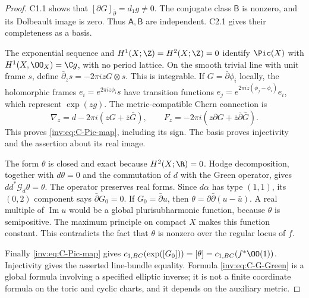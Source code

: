 \begin{proof}
C1.1 shows that $[\partial G]_{\bar\partial}=d_1g\ne0$.
The conjugate class $\mathsf B$ is nonzero, and its Dolbeault image
is zero.  Thus $\mathsf A,\mathsf B$ are independent.  C2.1 gives
their completeness as a basis.

The exponential sequence and $H^1(X;\Z)=H^2(X;\Z)=0$ identify
$\Pic(X)$ with $H^1(X,\OO_X)=\C g$, with no period lattice.
On the smooth trivial line with unit frame $s$, define
$\bar\partial_zs=-2\pi izG\otimes s$.  This is integrable.
If $G=\bar\partial\phi_i$ locally, the holomorphic frames
$e_i=e^{2\pi iz\phi_i}s$ have transition functions
$e_j=e^{2\pi iz(\phi_j-\phi_i)}e_i$, which represent
$\exp(zg)$.  The metric-compatible Chern connection is
\[
\nabla_z=d-2\pi i(zG+\bar z\bar G),\qquad
F_z=-2\pi i(z\partial G+\bar z\bar\partial\bar G).
\]
This proves \eqref{inv:eq:C-Pic-map}, including its sign.  The basis
proves injectivity and the assertion about its real image.

The form $\theta$ is closed and exact because $H^2(X;\R)=0$.
Hodge decomposition, together with $d\theta=0$ and the commutation
of $d$ with the Green operator, gives $dd^*\mathcal G_d\theta=
\theta$.  The operator preserves real forms.  Since $d\alpha$ has
type $(1,1)$, its $(0,2)$ component says
$\bar\partial G_0=0$.  If $G_0=\bar\partial u$, then
$\theta=\partial\bar\partial(u-\bar u)$.  A real multiple of
$\operatorname{Im}u$ would be a global plurisubharmonic function,
because $\theta$ is semipositive.  The maximum principle on compact
$X$ makes this function constant.  This contradicts the fact that
$\theta$ is nonzero over the regular locus of $f$.

Finally \eqref{inv:eq:C-Pic-map} gives
$c_{1,BC}(\exp([G_0]))=[\theta]=c_{1,BC}(f^*\OO(1))$.
Injectivity gives the asserted line-bundle equality.  Formula
\eqref{inv:eq:C-G-Green} is a global formula involving a specified
elliptic inverse; it is not a finite coordinate formula on the toric
and cyclic charts, and it depends on the auxiliary metric.
\end{proof}

